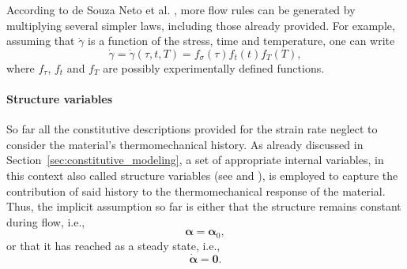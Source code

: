 According to de Souza Neto et al. \citep{desouzanetoComputationalMethodsPlasticity2008}, more flow rules can be generated by multiplying several simpler laws, including those already provided.
For example, assuming that $\dot \gamma$ is a function of the stress, time and temperature, one can write
\begin{equation}
	\dot \gamma = \dot \gamma(\tau, t, T) = f_\sigma (\tau) f_t(t) f_T(T),
\end{equation}
where $f_\tau$, $f_t$ and $f_T$ are possibly experimentally defined functions.


\paragraph{Structure variables}
So far all the constitutive descriptions provided for the strain rate neglect to consider the material's thermomechanical history.
As already discussed in Section~\ref{sec:constitutive_modeling}, a set of appropriate internal variables, in this context also called structure variables (see \cite{kocks1975thermodynamics} and \cite{frostDeformationmechanismMapsPlasticity1982}), is employed to capture the contribution of said history to the thermomechanical response of the material.
Thus, the implicit assumption so far is either that the structure remains constant during flow, i.e.,
\begin{equation}
  \bm \alpha = \bm \alpha_0,
\end{equation}
or that it has reached as a steady state, i.e.,
\begin{equation}
  \dot{\bm \alpha} = \bm 0.
\end{equation}

